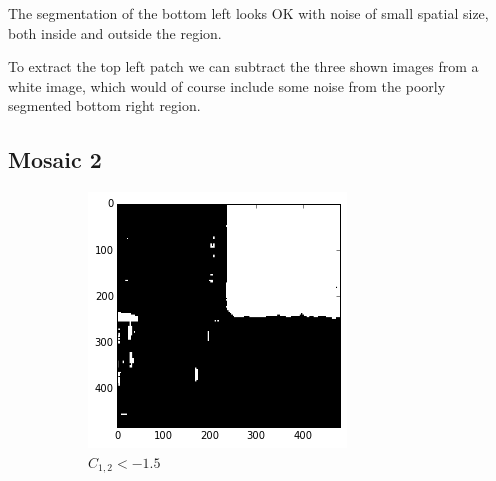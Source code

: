 \documentclass[a4paper]{article}
\begin{document}
The segmentation of the bottom left looks OK with noise of small spatial
size, both inside and outside the region.

To extract the top left patch we can subtract the three shown images
from a white image, which would of course include some noise from the
poorly segmented bottom right region.

\subsection{Mosaic 2}

\begin{figure}
    \centering
    \begin{subfigure}[b]{0.23\textwidth}
        \centering
        \includegraphics[width=\textwidth]{segm_2_c12_low.png}
        \caption{%
            $C_{1,2} < -1.5$
        }
    \end{subfigure}
    ~
    \begin{subfigure}[b]{0.23\textwidth}
        \centering

\end{subfigure}
\end{figure}
\end{document}
